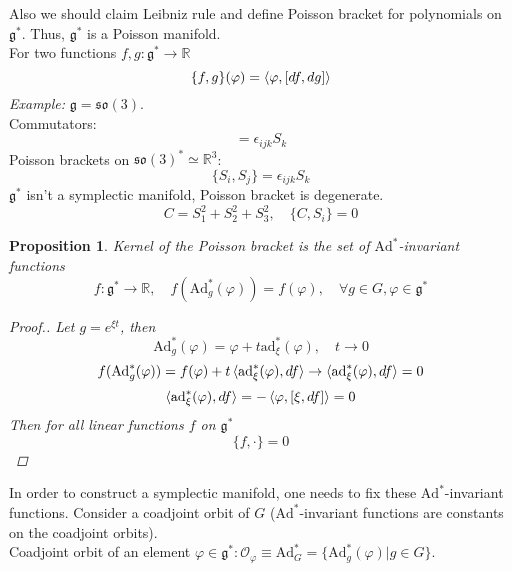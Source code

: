 \documentclass[12pt]{article}
\newtheorem{prop}[theorem]{Proposition}
\theoremstyle{definition}
\begin{document}
Also we should claim Leibniz rule and define Poisson bracket for polynomials on $\mathfrak{g}^*$. Thus, $\mathfrak{g}^*$ is a Poisson manifold.\\
For two functions $f,g:\mathfrak{g}^*\rightarrow\mathbb{R}$
\begin{equation}
    \{f,g\}(\varphi)=\braket{\varphi,[df,dg]}
\end{equation}
\textit{Example:} $\mathfrak{g}=\mathfrak{so}(3)$.\\
Commutators:
\begin{equation}
    [S_i,S_j]=\epsilon_{ijk}S_k
\end{equation}
Poisson brackets on $\mathfrak{so}(3)^*\simeq\mathbb{R}^3$:
\begin{equation}
    \{S_i,S_j\}=\epsilon_{ijk}S_k
\end{equation}
$\mathfrak{g}^*$ isn't a symplectic manifold, Poisson bracket is degenerate.
\begin{equation}
    C=S_1^2+S_2^2+S_3^2,\quad\{C,S_i\}=0
\end{equation}
\begin{prop}
    Kernel of the Poisson bracket is the set of $\text{Ad}^*$-invariant functions
    \begin{equation}
        f:\mathfrak{g}^*\rightarrow\mathbb{R},\quad f(\text{Ad}^*_g(\varphi))=f(\varphi),\quad\forall g\in G,\varphi\in\mathfrak{g}^*
    \end{equation}
    \begin{proof}[Proof.]
        Let $g=e^{\xi t}$, then
        \begin{equation}
            \text{Ad}^*_g(\varphi)=\varphi+t\text{ad}^*_\xi(\varphi),\quad t\rightarrow 0
        \end{equation}
        \begin{equation}
            f(\text{Ad}^*_g(\varphi))=f(\varphi)+t\braket{\text{ad}^*_\xi(\varphi),df}\rightarrow\braket{\text{ad}^*_\xi(\varphi),df}=0
        \end{equation}
        \begin{equation}
            \braket{\text{ad}^*_\xi(\varphi),df}=-\braket{\varphi,[\xi,df]}=0
        \end{equation}
        Then for all linear functions $f$ on $\mathfrak{g}^*$
        \begin{equation}
            \{f,\cdot\}=0
        \end{equation}
    \end{proof}
\end{prop}    
In order to construct a symplectic manifold, one needs to fix these $\text{Ad}^*$-invariant functions. Consider a coadjoint orbit of $G$ ($\text{Ad}^*$-invariant functions are constants on the coadjoint orbits).\\
Coadjoint orbit of an element $\varphi\in\mathfrak{g}^*:\mathcal{O}_\varphi\equiv\text{Ad}^*_G=\{\text{Ad}^*_g(\varphi)|g\in G\}$.
\end{document}
